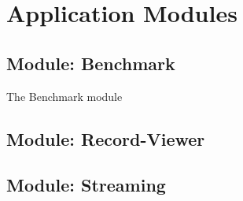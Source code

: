\chapter{Application Modules}
\label{ch:app}

\section{Module: Benchmark}
\label{sec:benchmark}

The Benchmark module 

\section{Module: Record-Viewer}
\label{sec:recordviewer}

\section{Module: Streaming}
\label{sec:streaming}

